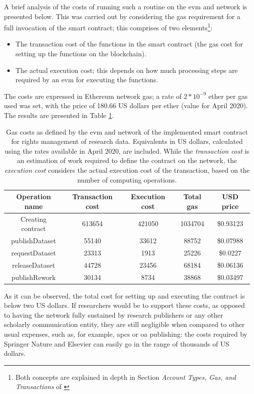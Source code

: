 A brief analysis of the costs of running such a routine on the \gls{evm} and network is presented below. This was carried out by considering the gas requirement for a full invocation of the smart contract; this comprises of two elements\footnote{Both concepts are explained in depth in Section \emph{Account Types, Gas, and Transactions} of \cite{ethdocs}}:

\begin{itemize}
    \item The transaction cost of the functions in the smart contract (the gas cost for setting up the functions on the blockchain).
    \item The actual execution cost; this depends on how much processing steps are required by an \gls{evm} for executing the functions.
\end{itemize}

The costs are expressed in Ethereum network gas; a
rate of $2*10^{-9}$ ether per gas used was set, with the price of 180.66 US dollars per ether (value for April 2020). The results are presented in Table \ref{tbl:eth}. 
\begin{table}
\begin{tabular}{ |c|c|c|c|c| } 
 \hline
 Operation name & Transaction cost & Execution cost & Total gas & USD price \\
 \hline
 \hline
 Creating contract & 613654 & 421050 & 1034704 & \$0.93123 \\
 \hline
 publishDataset & 55140 & 33612 & 88752 & \$0.07988 \\
 \hline
 requestDataset & 23313 & 1913 & 25226 & \$0.0227 \\
 \hline
 releaseDataset & 44728 & 23456 & 68184 & \$0.06136 \\
 \hline
 publishRework & 30134 & 8734 & 38868 & \$0.03497 \\
 \hline
\end{tabular}
\caption{Gas costs as defined by the \gls{evm} and network of the implemented smart contract for rights management of research data. Equivalents in US dollars, calculated using the rates available in April 2020, are included. While the \emph{transaction cost} is an estimation of work required to define the contract on the network, the \emph{execution cost} considers the actual execution cost of the transaction, based on the number of computing operations.}
\label{tbl:eth}
\end{table}

As it can be observed, the total cost for setting up and executing the contract is below two US dollars. If researchers would be to support these costs, as opposed to having the
network fully sustained by research publishers or any other scholarly communication entity, they are still negligible when compared to other usual expenses, such as, for example, \glspl{apc} or \gls{oa} publishing: the costs required by Springer Nature and Elsevier can easily go in the range of thousands of US dollars\cite{elsevierapc,snoa}. 

